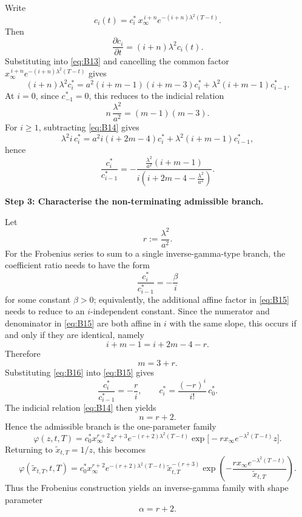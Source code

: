 \documentclass[12pt]{article}
\theoremstyle{statementstyle}
\begin{document}
\begin{appendices}
Write
\[
c_i(t)=c_i^{*}\,x_{\infty}^{\,i+n}e^{-(i+n)\lambda^{2}(T-t)}.
\]
Then
\[
\frac{\partial c_i}{\partial t}=(i+n)\lambda^{2}c_i(t).
\]
Substituting into \eqref{eq:B13} and cancelling the common factor
\(x_{\infty}^{\,i+n}e^{-(i+n)\lambda^{2}(T-t)}\) gives
\[
(i+n)\lambda^{2}c_i^{*}
=
a^{2}(i+m-1)(i+m-3)c_i^{*}
+
\lambda^{2}(i+m-1)c_{i-1}^{*}.
\]
At \(i=0\), since \(c_{-1}^{*}=0\), this reduces to the indicial relation
\begin{equation}
n\,\frac{\lambda^{2}}{a^{2}}=(m-1)(m-3).
\tag{B.1.4}\label{eq:B14}
\end{equation}
For \(i\ge 1\), subtracting \eqref{eq:B14} gives
\[
\lambda^{2} i\,c_i^{*}
=
a^{2}i(i+2m-4)c_i^{*}
+
\lambda^{2}(i+m-1)c_{i-1}^{*},
\]
hence
\begin{equation}
\frac{c_i^{*}}{c_{i-1}^{*}}
=
-\frac{\frac{\lambda^{2}}{a^{2}}(i+m-1)}{i\left(i+2m-4-\frac{\lambda^{2}}{a^{2}}\right)}.
\tag{B.1.5}\label{eq:B15}
\end{equation}

\medskip
\noindent\textbf{Step 3: Characterise the non-terminating admissible branch.}

Let
\[
r:=\frac{\lambda^{2}}{a^{2}}.
\]
For the Frobenius series to sum to a single inverse-gamma-type branch,
the coefficient ratio needs to have the form
\[
\frac{c_i^{*}}{c_{i-1}^{*}}=-\frac{\beta}{i}
\]
for some constant \(\beta>0\); equivalently, the additional affine factor
in \eqref{eq:B15} needs to reduce to an \(i\)-independent constant. Since the
numerator and denominator in \eqref{eq:B15} are both affine in \(i\) with
the same slope, this occurs if and only if they are identical, namely
\[
i+m-1=i+2m-4-r.
\]
Therefore
\begin{equation}
m=3+r.
\tag{B.1.6}\label{eq:B16}
\end{equation}
Substituting \eqref{eq:B16} into \eqref{eq:B15} gives
\begin{equation}
\frac{c_i^{*}}{c_{i-1}^{*}}=-\frac{r}{i},
\qquad
c_i^{*}=\frac{(-r)^i}{i!}\,c_0^{*}.
\tag{B.1.7}\label{eq:B17}
\end{equation}
The indicial relation \eqref{eq:B14} then yields
\begin{equation}
n=r+2.
\tag{B.1.8}\label{eq:B18}
\end{equation}
Hence the admissible branch is the one-parameter family
\[
\varphi(z,t,T)
=
c_0^{*}x_{\infty}^{r+2}z^{r+3}e^{-(r+2)\lambda^{2}(T-t)}
\exp\!\bigl[-r x_{\infty}e^{-\lambda^{2}(T-t)}z\bigr].
\]
Returning to \(\widetilde{x}_{t,T}=1/z\), this becomes
\begin{equation}
\varphi(\widetilde{x}_{t,T},t,T)
=
c_0^{*}x_{\infty}^{r+2}e^{-(r+2)\lambda^{2}(T-t)}
\widetilde{x}_{t,T}^{-(r+3)}
\exp\!\left(-\frac{r x_{\infty}e^{-\lambda^{2}(T-t)}}{\widetilde{x}_{t,T}}\right).
\tag{B.1.9}\label{eq:B19}
\end{equation}
Thus the Frobenius construction yields an inverse-gamma family with shape
parameter
\[
\alpha=r+2.
\]



\end{appendices}
\end{document}
